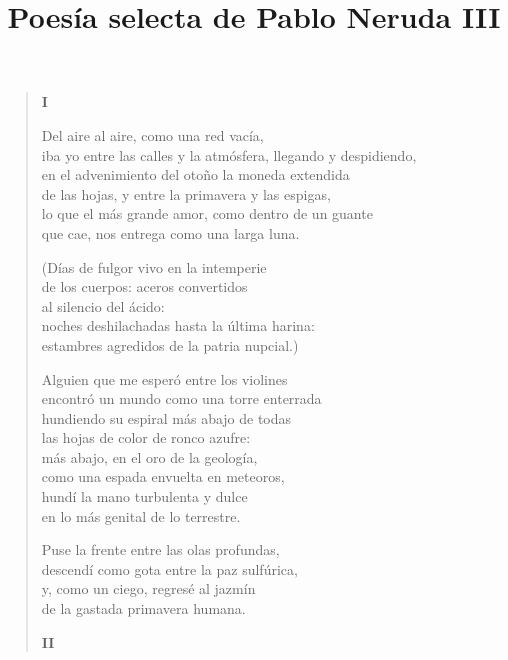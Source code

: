 \documentclass[12pt]{article}
\date{}
\title{Poesía selecta de Pablo Neruda III}
\begin{document}
\maketitle
\tableofcontents
\clearpage
{}
\begin{verse}

{\bfseries\scshape {I}}

Del aire al aire, como una red vacía,\\
iba yo entre las calles y la atmósfera, llegando y despidiendo,\\
en el advenimiento del otoño la moneda extendida\\
de las hojas, y entre la primavera y las espigas,\\
lo que el más grande amor, como dentro de un guante\\
que cae, nos entrega como una larga luna.  

(Días de fulgor vivo en la intemperie\\
de los cuerpos: aceros convertidos\\
al silencio del ácido:\\
noches deshilachadas hasta la última harina:\\
estambres agredidos de la patria nupcial.)  

Alguien que me esperó entre los violines\\
encontró un mundo como una torre enterrada\\
hundiendo su espiral más abajo de todas\\
las hojas de color de ronco azufre:\\
más abajo, en el oro de la geología,\\
como una espada envuelta en meteoros,\\
hundí la mano turbulenta y dulce\\
en lo más genital de lo terrestre.  

Puse la frente entre las olas profundas,\\
descendí como gota entre la paz sulfúrica,\\
y, como un ciego, regresé al jazmín\\
de la gastada primavera humana.  

{\bfseries\scshape {II}}


\end{verse}
\end{document}
